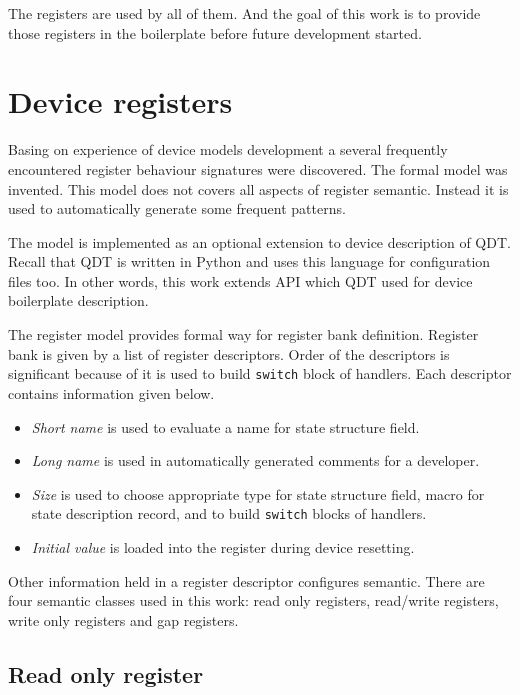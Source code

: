 \documentclass[conference,compsoc,a4paper]{IEEEtran}
\begin{document}
The registers are used by all of them.
And the goal of this work is to provide those registers in the boilerplate
before future development started.

\section{Device registers}

Basing on experience of device models development a several frequently
encountered register behaviour signatures were discovered.
The formal model was invented.
This model does not covers all aspects of register semantic.
Instead it is used to automatically generate some frequent patterns.

The model is implemented as an optional extension to device description
of QDT.
Recall that QDT is written in Python and uses this language for
configuration files too.
In other words, this work extends API which QDT used for device
boilerplate description.

The register model provides formal way for register bank definition.
Register bank is given by a list of register descriptors.
Order of the descriptors is significant because of it is used to build
\texttt{switch} block of handlers.
Each descriptor contains information given below.

\begin{itemize}
    \item \textit{Short name} is used to evaluate a name for state structure
    field.
    \item \textit{Long name} is used in automatically generated comments for
    a developer.
    \item \textit{Size} is used to choose appropriate type
    for state structure field, macro for state description record,
    and to build \texttt{switch} blocks of handlers.
    \item \textit{Initial value} is loaded into the register during device
    resetting.
\end{itemize}

Other information held in a register descriptor configures semantic.
There are four semantic classes used in this work: read only registers,
read/write registers, write only registers and gap registers.

\subsection{Read only register}
\end{document}

